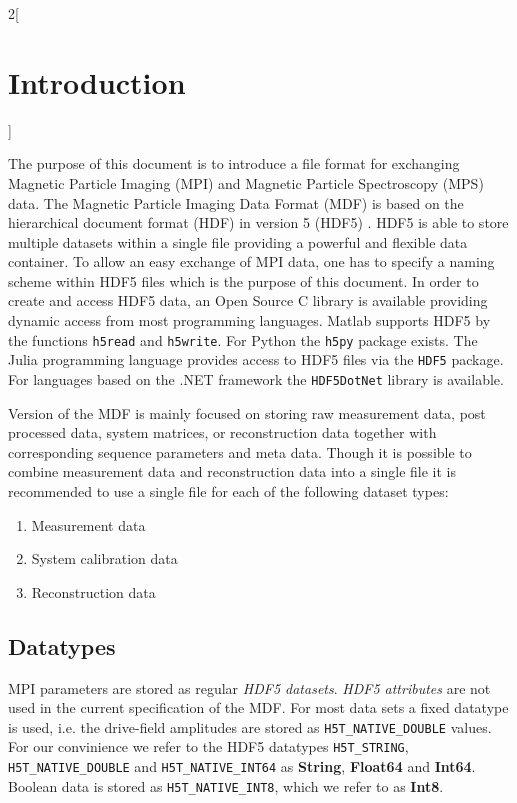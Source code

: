 \documentclass[landscape,a4paper]{article} %
\newcommand{\inl}[1]{\lstinline[columns=fixed]{#1}}
\newcommand{\inltab}[1]{{\ttfamily\bfseries\color{blue}#1}}
\begin{document}
\begin{multicols}{2}[\section{Introduction} \label{Sec:Introduction}]

The purpose of this document is to introduce a file format for exchanging Magnetic Particle Imaging (MPI) and Magnetic Particle Spectroscopy (MPS) data. The Magnetic Particle Imaging Data Format (MDF) is based on the hierarchical document format (HDF) in version 5 (HDF5) \cite{hdf5}. HDF5 is able to store multiple datasets within a single file providing a powerful and flexible data container. To allow an easy exchange of MPI data, one has to specify a naming scheme within HDF5 files which is the purpose of this document. In order to create and access HDF5 data, an Open Source C library is available providing dynamic access from most programming languages. Matlab supports HDF5 by the functions \inl{h5read} and \inl{h5write}. For Python the \inl{h5py} package exists. The Julia programming language provides access to HDF5 files via the \inl{HDF5} package. For languages based on the .NET framework the \inl{HDF5DotNet} library is available.

Version \version of the MDF is mainly focused on storing raw measurement data, post processed data, system matrices, or reconstruction data together with corresponding sequence parameters and meta data. Though it is possible to combine measurement data and reconstruction data into a single file it is recommended to use a single file for each of the following dataset types:
\begin{enumerate}
\setlength{\itemsep}{0pt}
\item Measurement data
\item System calibration data
\item Reconstruction data
\end{enumerate}

\subsection{Datatypes}

MPI parameters are stored as regular \textit{HDF5 datasets}. \textit{HDF5 attributes} are not used in the current specification of the MDF. For most data sets a fixed datatype is used, i.e. the drive-field amplitudes are stored as \inl{H5T_NATIVE_DOUBLE} values. For our convinience we refer to the HDF5 datatypes \inl{H5T_STRING}, \inl{H5T_NATIVE_DOUBLE} and \inl{H5T_NATIVE_INT64} as \inltab{String}, \inltab{Float64} and \inltab{Int64}. Boolean data is stored as \inl{H5T_NATIVE_INT8}, which we refer to as \inltab{Int8}.


\end{multicols}
\end{document}

